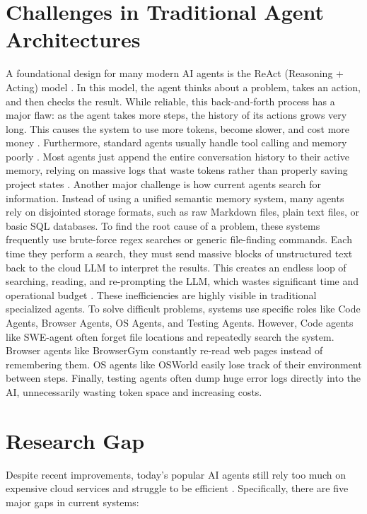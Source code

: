 \section{Challenges in Traditional Agent Architectures}
A foundational design for many modern AI agents is the ReAct (Reasoning + Acting) model \cite{yao2023react}. In this model, the agent thinks about a problem, takes an action, and then checks the result. While reliable, this back-and-forth process has a major flaw: as the agent takes more steps, the history of its actions grows very long. This causes the system to use more tokens, become slower, and cost more money \cite{token_economics, efficient_agents}. Furthermore, standard agents usually handle tool calling and memory poorly \cite{efficient_tool_select, langchain_langgraph}. Most agents just append the entire conversation history to their active memory, relying on massive logs that waste tokens rather than properly saving project states \cite{ai_agent-memory}. Another major challenge is how current agents search for information. Instead of using a unified semantic memory system, many agents rely on disjointed storage formats, such as raw Markdown files, plain text files, or basic SQL databases. To find the root cause of a problem, these systems frequently use brute-force regex searches or generic file-finding commands. Each time they perform a search, they must send massive blocks of unstructured text back to the cloud LLM to interpret the results. This creates an endless loop of searching, reading, and re-prompting the LLM, which wastes significant time and operational budget \cite{claude_code_dive, ai_agent-memory}. These inefficiencies are highly visible in traditional specialized agents. To solve difficult problems, systems use specific roles like Code Agents, Browser Agents, OS Agents, and Testing Agents. However, Code agents like SWE-agent \cite{yang2024sweagent} often forget file locations and repeatedly search the system. Browser agents like BrowserGym \cite{chezelles2025browsergym} constantly re-read web pages instead of remembering them. OS agents like OSWorld \cite{xie2024osworld} easily lose track of their environment between steps. Finally, testing agents often dump huge error logs directly into the AI, unnecessarily wasting token space and increasing costs.

\section{Research Gap}
Despite recent improvements, today's popular AI agents still rely too much on expensive cloud services and struggle to be efficient \cite{efficient_agents}. Specifically, there are five major gaps in current systems:

